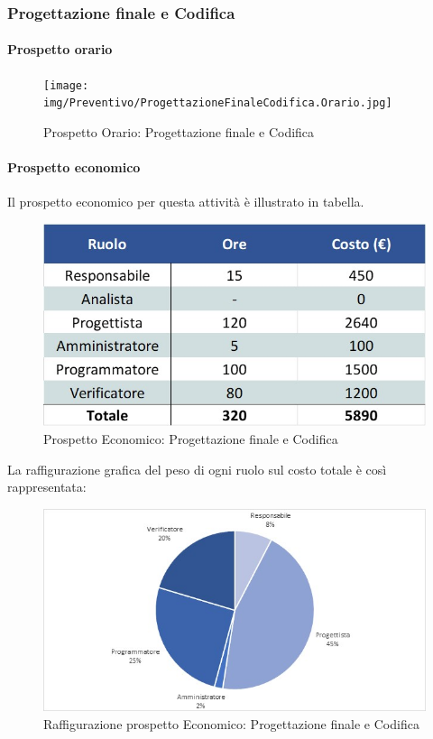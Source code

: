 \subsubsection{Progettazione finale e Codifica}
\paragraph{Prospetto orario}
\begin{figure}[h!]
	\centerline{\texttt{[image: img/Preventivo/ProgettazioneFinaleCodifica.Orario.jpg]}}
	\caption{Prospetto Orario: Progettazione finale e Codifica}
\end{figure}
\paragraph{Prospetto economico}
Il prospetto economico per questa attività è illustrato in tabella. 
\begin{figure}[h!]
	\centerline{\includegraphics[scale=0.4]{img/Preventivo/ProgettazioneFinaleCodifica.Economico.jpg}}
	\caption{Prospetto Economico: Progettazione finale e Codifica}
\end{figure}
La raffigurazione grafica del peso di ogni ruolo sul costo totale è così rappresentata: 
\begin{figure}[h!]
	\centerline{\includegraphics[scale=0.4]{img/Preventivo/Torte/ProgettazioneFinaleCodifica.jpg}}
	\caption{Raffigurazione prospetto Economico: Progettazione finale e Codifica}
\end{figure} 

